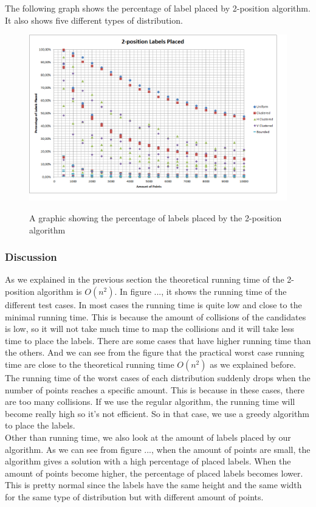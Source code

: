 \documentclass[crop=false,a4paper,oneside,11pt]{standalone}
\begin{document}
The following graph shows the percentage of label placed by 2-position algorithm. It also shows five different types of distribution.
\begin{figure}[h!]
 \centering
  \includegraphics[scale = 0.5]{2PosLabelsPlaced.png}\\
  \caption{A graphic showing the percentage of labels placed by the 2-position algorithm}
 \end{figure}
\subsubsection{Discussion}
As we explained in the previous section the theoretical running time of the 2-position algorithm is $O(n^2)$. In figure ..., it shows the running time of the different test cases. In most cases the running time is quite low and close to the minimal running time. This is because the amount of collisions of the candidates is low, so it will not take much time to map the collisions and it will take less time to place the labels. There are some cases that have higher running time than the others. And we can see from the figure that the practical worst case running time are close to the theoretical running time $O(n^2)$ as we explained before. \\
The running time of the worst cases of each distribution suddenly drops when the number of points reaches a specific amount. This is because in these cases, there are too many collisions. If we use the regular algorithm, the running time will become really high so it's not efficient. So in that case, we use a greedy algorithm to place the labels.\\
Other than running time, we also look at the amount of labels placed by our algorithm. As we can see from figure ..., when the amount of points are small, the algorithm gives a solution with a high percentage of placed labels. When the amount of points become higher, the percentage of placed labels becomes lower. This is pretty normal since the labels have the same height and the same width for the same type of distribution but with different amount of points.\\
\end{document}
